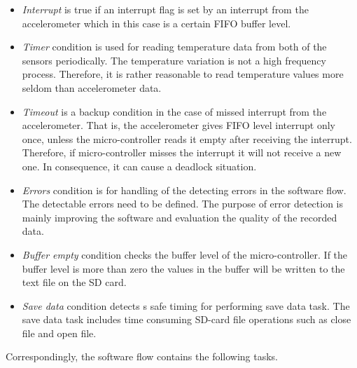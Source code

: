 \documentclass[english,12pt,a4paper,pdftex,elec,utf8]{aaltothesis}
\begin{document}
\begin{itemize}
\item \textit{Interrupt} is true if an interrupt flag is set by an interrupt from the accelerometer which in this case is a certain FIFO buffer level.

\item \textit{Timer} condition is used for reading temperature data from both of the sensors periodically. The temperature variation is not a high frequency process. Therefore, it is rather reasonable to read temperature values more seldom than accelerometer data.

\item \textit{Timeout} is a backup condition in the case of missed interrupt from the accelerometer. That is, the accelerometer gives FIFO level interrupt only once, unless the micro-controller reads it empty after receiving the interrupt. Therefore, if micro-controller misses the interrupt it will not receive a new one. In consequence, it can cause a deadlock situation.

\item \textit{Errors} condition is for handling of the detecting errors in the software flow. The detectable errors need to be defined. The purpose of error detection is mainly improving the software and evaluation the quality of the recorded data.

\item \textit{Buffer empty} condition checks the buffer level of the micro-controller. If the buffer level is more than zero the values in the buffer will be written to the text file on the SD card.

\item \textit{Save data} condition detects s safe timing for performing save data task. The save data task includes time consuming SD-card file operations such as close file and open file.

\end{itemize}
Correspondingly, the software flow contains the following tasks.
\end{document}
